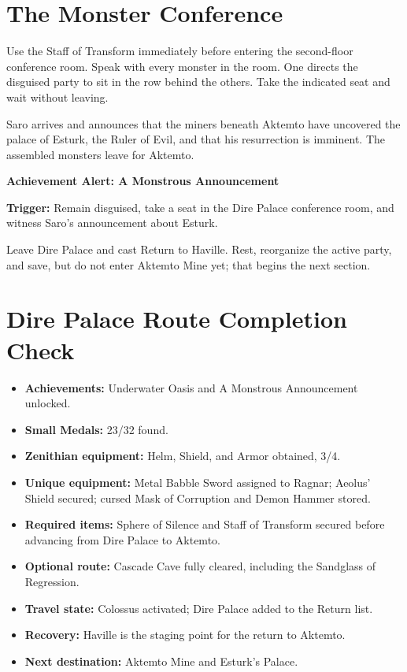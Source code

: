 \documentclass[
  american,
  10pt,
  letterpaper,
  oneside,
  open=any]{scrreprt}
\providecommand{\tightlist}{%
  \setlength{\itemsep}{0pt}\setlength{\parskip}{0pt}}
\newenvironment{guidetable}{%
  \small\setstretch{1.0}%
  \setlength{\tabcolsep}{4pt}%
  \setlength{\LTpre}{8pt}\setlength{\LTpost}{10pt}%
  \renewcommand{\arraystretch}{1.16}%
}{ }
\begin{document}
\begin{guidetable}
\end{guidetable}

\section{The Monster Conference}\label{the-monster-conference}

Use the Staff of Transform immediately before entering the second-floor
conference room. Speak with every monster in the room. One directs the
disguised party to sit in the row behind the others. Take the indicated
seat and wait without leaving.

Saro arrives and announces that the miners beneath Aktemto have
uncovered the palace of Esturk, the Ruler of Evil, and that his
resurrection is imminent. The assembled monsters leave for Aktemto.

\begin{achievementalert}

\textbf{Achievement Alert: A Monstrous Announcement}

\textbf{Trigger:} Remain disguised, take a seat in the Dire Palace
conference room, and witness Saro's announcement about Esturk.

\end{achievementalert}

Leave Dire Palace and cast Return to Haville. Rest, reorganize the
active party, and save, but do not enter Aktemto Mine yet; that begins
the next section.

\section{Dire Palace Route Completion
Check}\label{dire-palace-route-completion-check}

\begin{itemize}
\tightlist
\item
  \textbf{Achievements:} Underwater Oasis and A Monstrous Announcement
  unlocked.
\item
  \textbf{Small Medals:} 23/32 found.
\item
  \textbf{Zenithian equipment:} Helm, Shield, and Armor obtained, 3/4.
\item
  \textbf{Unique equipment:} Metal Babble Sword assigned to Ragnar;
  Aeolus' Shield secured; cursed Mask of Corruption and Demon Hammer
  stored.
\item
  \textbf{Required items:} Sphere of Silence and Staff of Transform
  secured before advancing from Dire Palace to Aktemto.
\item
  \textbf{Optional route:} Cascade Cave fully cleared, including the
  Sandglass of Regression.
\item
  \textbf{Travel state:} Colossus activated; Dire Palace added to the
  Return list.
\item
  \textbf{Recovery:} Haville is the staging point for the return to
  Aktemto.
\item
  \textbf{Next destination:} Aktemto Mine and Esturk's Palace.
\end{itemize}
\end{document}
